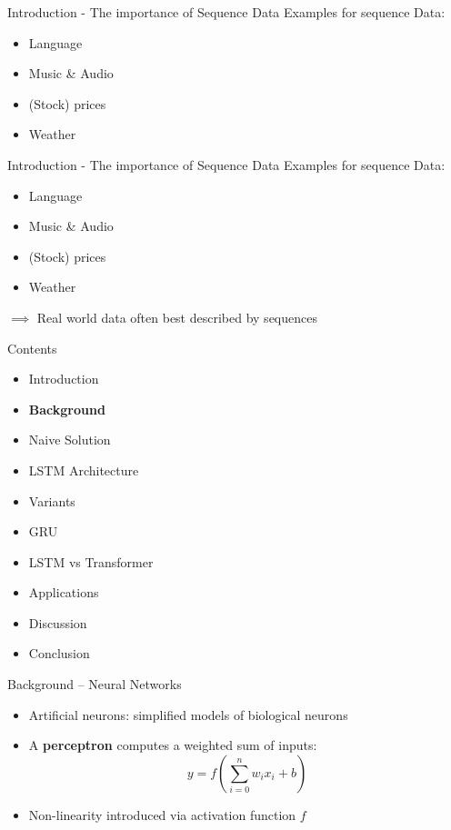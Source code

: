 \documentclass[10pt, aspectratio=169]{beamer}
\begin{document}
\begin{frame}[t]{Introduction - The importance of Sequence Data}
Examples for sequence Data:
\begin{itemize}
    \item Language
    \item Music \& Audio
    \item (Stock) prices
    \item Weather
\end{itemize}
\end{frame}

\begin{frame}[t]{Introduction - The importance of Sequence Data}
Examples for sequence Data:
\begin{itemize}
    \item Language
    \item Music \& Audio
    \item (Stock) prices
    \item Weather
\end{itemize}
\begin{math}\implies\end{math} Real world data often best described by sequences
\end{frame}



\begin{frame}[t]{Contents}
\begin{itemize}
    \item Introduction
    \item \textbf{Background}
    \item Naive Solution
    \item LSTM Architecture
    \item Variants
    \item GRU
    \item LSTM vs Transformer
    \item Applications
    \item Discussion
    \item Conclusion
\end{itemize}
\end{frame}


\begin{frame}[t]{Background – Neural Networks}
\begin{itemize}
  \item Artificial neurons: simplified models of biological neurons
    \pause
  \item A \textbf{perceptron} computes a weighted sum of inputs:
    \[
      y = f\left(\sum_{i=0}^{n}{w_ix_i + b}\right)
    \]
    \pause
  \item Non-linearity introduced via activation function $f$
\end{itemize}
\end{frame}
\end{document}
